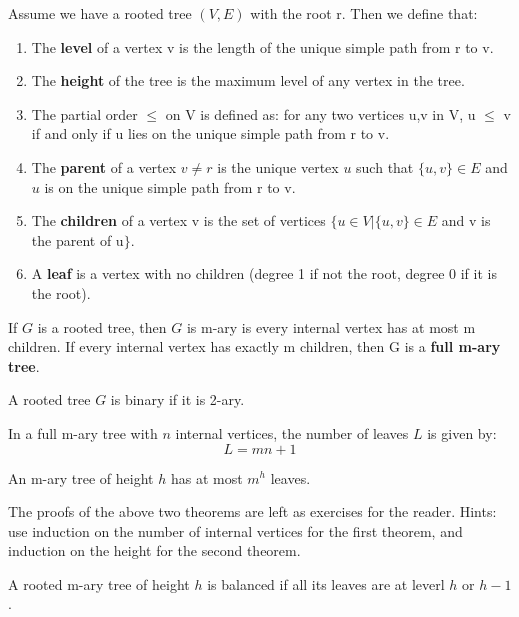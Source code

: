 \begin{definition}
Assume we have a rooted tree $(V,E)$ with the root r. Then we define that:
\begin{enumerate}
    \item The \textbf{level} of a vertex v is the length of the unique simple path from r to v.
    \item The \textbf{height} of the tree is the maximum level of any vertex in the tree.
    \item The partial order $\leq$ on V is defined as: for any two vertices u,v in V, u $\leq$ v if and only if u lies on the unique simple path from r to v.
    \item The \textbf{parent} of a vertex $v \neq r$ is the unique vertex $u$ such that $\{u,v\} \in E$ and $u$ is on the unique simple path from r to v.
    \item The \textbf{children} of a vertex v is the set of vertices $\{u \in V | \{u,v\} \in E$ and v is the parent of u$\}$.
    \item A \textbf{leaf} is a vertex with no children (degree 1 if not the root, degree 0 if it is the root).
\end{enumerate}
\end{definition}

\begin{definition}
If $G$ is a rooted tree, then $G$ is m-ary is every internal vertex has at most m children. If every internal vertex has exactly m children, then G is a \textbf{full m-ary tree}.
\end{definition}

\begin{definition}
A rooted tree $G$ is binary if it is 2-ary.
\end{definition}

\begin{theorem}
In a full m-ary tree with $n$ internal vertices, the number of leaves $L$ is given by:
\[ L = mn + 1 \]
\end{theorem}

\begin{theorem}
An m-ary tree of height $h$ has at most $m^h$ leaves.
\end{theorem}

The proofs of the above two theorems are left as exercises for the reader. Hints: use induction on the number of internal vertices for the first theorem, and induction on the height for the second theorem.

\begin{definition}
A rooted m-ary tree of height $h$ is balanced if all its leaves are at leverl $h$ or $h-1$.
\end{definition}


